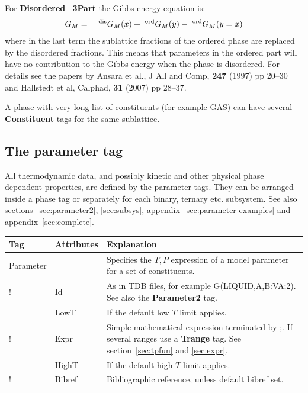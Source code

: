 \documentclass{article}
\begin{document}
For {\bf Disordered\_3Part} the Gibbs energy equation is:
\begin{eqnarray}
G_M &=& ~^{\rm dis}G_M(x) + ~^{\rm ord}G_M(y) - ~^{\rm ord}G_M(y=x) \label{eq:sub}
\end{eqnarray}
where in the last term the sublattice fractions of the ordered phase
are replaced by the disordered fractions.  This means that parameters
in the ordered part will have no contribution to the Gibbs energy when
the phase is disordered.  For details see the papers by Ansara et al.,
J All and Comp, {\bf 247} (1997) pp 20--30 and Hallstedt et al,
Calphad, {\bf 31} (2007) pp 28--37.

A phase with very long list of constituents (for example GAS) can have
several {\bf Constituent} tags for the same sublattice.

\subsection{The parameter tag}\label{sec:parametertag}

All thermodynamic data, and possibly kinetic and other physical phase
dependent properties, are defined by the parameter tags.  They can be
arranged inside a phase tag or separately for each binary, ternary
etc. subsystem.  See also sections~\ref{sec:parameter2},
\ref{sec:subsys}, appendix~\ref{sec:parameter examples} and
appendix~\ref{sec:complete}.

\bigskip
\begin{tabular}{|p{} p{} p{}|}\hline
  Tag & Attributes & Explanation\\\hline

  Parameter & & Specifies the $T, P$ expression of a model parameter for a set of constituents.\\
!      & Id & As in TDB files, for example G(LIQUID,A,B:VA;2).  See also the {\bf Parameter2} tag. \\
      & LowT & If the default low $T$ limit applies.\\
!      & Expr & Simple mathematical expression terminated by ;.  If several ranges use a {\bf Trange} tag.  See section~\ref{sec:tpfun} and \ref{sec:expr}.\\
      & HighT & If the default high $T$ limit applies.\\
!      & Bibref & Bibliographic reference, unless default bibref set.\\\hline
\end{tabular}
\end{document}
